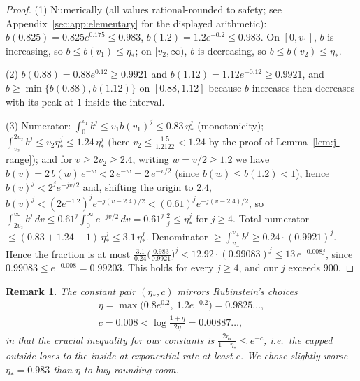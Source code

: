 \documentclass[11pt]{amsart}
\newtheorem{remark}[theorem]{Remark}
\numberwithin{equation}{section}
\begin{document}
\begin{proof}
(1) Numerically (all values rational-rounded to safety; see
Appendix~\ref{sec:app:elementary} for the displayed arithmetic):
$b(0.825) = 0.825 e^{0.175} \le 0.983$, $b(1.2) = 1.2e^{-0.2} \le
0.983$. On $[0,v_1]$, $b$ is increasing, so $b \le b(v_1) \le \eta_*$; on
$[v_2,\infty)$, $b$ is decreasing, so $b \le b(v_2) \le \eta_*$.

(2) $b(0.88) = 0.88e^{0.12} \ge 0.9921$ and $b(1.12) = 1.12e^{-0.12}
\ge 0.9921$, and $b \ge \min\{b(0.88), b(1.12)\}$ on $[0.88,1.12]$
because $b$ increases then decreases with its peak at $1$ inside the
interval.

(3) Numerator: $\int_0^{v_1} b^j \le v_1 b(v_1)^j \le
0.83\,\eta_*^j$
(monotonicity); $\int_{v_2}^{2v_2} b^j \le v_2 \eta_*^j \le
1.24\,\eta_*^j$ (here $v_2 \le \tfrac{1.5}{1.2122} < 1.24$ by the proof
of Lemma~\ref{lem:j-range}); and for $v \ge 2v_2 \ge 2.4$, writing
$w = v/2 \ge 1.2$ we have $b(v) = 2\,b(w)\,e^{-w} < 2\,e^{-w} =
2\,e^{-v/2}$ (since $b(w) \le b(1.2) < 1$), hence
$b(v)^j < 2^j e^{-jv/2}$ and, shifting the origin to $2.4$,
$b(v)^j < (2e^{-1.2})^j e^{-j(v-2.4)/2} < (0.61)^j e^{-j(v-2.4)/2}$,
so $\int_{2v_2}^\infty b^j\,dv \le 0.61^j
\int_0^\infty e^{-jv/2}\,dv = 0.61^j\,\frac{2}{j} \le \eta_*^j$ for
$j \ge 4$. Total numerator $\le (0.83 + 1.24 + 1)\,\eta_*^j \le
3.1\,\eta_*^j$.
Denominator $\ge \int_{v_-}^{v_+} b^j \ge 0.24 \cdot (0.9921)^j$.
Hence the fraction is at most
$\frac{3.1}{0.24}\bigl(\frac{0.983}{0.9921}\bigr)^{j} < 12.92 \cdot
(0.99083)^{j} \le 13\,e^{-0.008j}$, since $0.99083 \le e^{-0.008} =
0.99203$. This holds for every $j \ge 4$, and our $j$ exceeds $900$.
\end{proof}

\begin{remark}
The constant pair $(\eta_*, c)$ mirrors Rubinstein's choices
\begin{gather*}
\eta = \max\bigl(0.8e^{0.2},\ 1.2e^{-0.2}\bigr) = 0.9825\ldots,\\
c = 0.008 < \log\frac{1+\eta}{2\eta} = 0.00887\ldots,
\end{gather*}
in that the crucial inequality for our constants is
$\frac{2\eta_*}{1+\eta_*} \le e^{-c}$, i.e.\ the capped outside loses
to the inside at exponential rate at least $c$. We chose slightly
worse $\eta_* = 0.983$ than $\eta$ to buy rounding room.
\end{remark}
\end{document}
